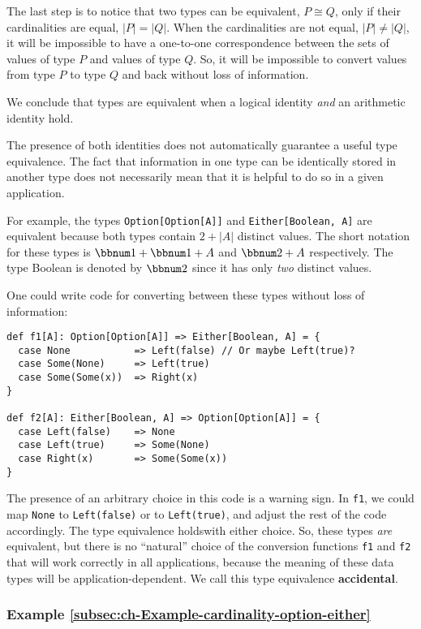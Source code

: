 The last step is to notice that two types can be equivalent, $P\cong Q$,
only if their cardinalities are equal, $\left|P\right|=\left|Q\right|$.
When the cardinalities are not equal, $\left|P\right|\neq\left|Q\right|$,
it will be impossible to have a one-to-one correspondence between
the sets of values of type $P$ and values of type $Q$. So, it will
be impossible to convert values from type $P$ to type $Q$ and back
without loss of information.

We conclude that types are equivalent when a logical identity \emph{and}
an arithmetic identity hold.

The presence of both identities does not automatically guarantee a
useful type equivalence. The fact that information in one type can
be identically stored in another type does not necessarily mean that
it is helpful to do so in a given application.

For example, the types \lstinline!Option[Option[A]]! and \lstinline!Either[Boolean, A]!
are equivalent because both types contain $2+\left|A\right|$ distinct
values. The short notation for these types is $\bbnum 1+\bbnum 1+A$
and $\bbnum 2+A$ respectively. The type Boolean is denoted by $\bbnum 2$
since it has only \emph{two} distinct values. 

One could write code for converting between these types without loss
of information:
\begin{lstlisting}
def f1[A]: Option[Option[A]] => Either[Boolean, A] = {
  case None           => Left(false) // Or maybe Left(true)?
  case Some(None)     => Left(true)
  case Some(Some(x))  => Right(x)
}

def f2[A]: Either[Boolean, A] => Option[Option[A]] = {
  case Left(false)    => None
  case Left(true)     => Some(None)
  case Right(x)       => Some(Some(x))
}
\end{lstlisting}
The presence of an arbitrary choice in this code is a warning sign.
In \lstinline!f1!, we could map \lstinline!None! to \lstinline!Left(false)!
or to \lstinline!Left(true)!, and adjust the rest of the code accordingly.
The type equivalence holdswith either choice. So, these types \emph{are}
equivalent, but there is no \textsf{``}natural\textsf{''} choice of the conversion
functions \lstinline!f1! and \lstinline!f2! that will work correctly
in all applications, because the meaning of these data types will
be application-dependent. We call this type equivalence \textbf{accidental}.

\subsubsection{Example \label{subsec:ch-Example-cardinality-option-either}\ref{subsec:ch-Example-cardinality-option-either}}

